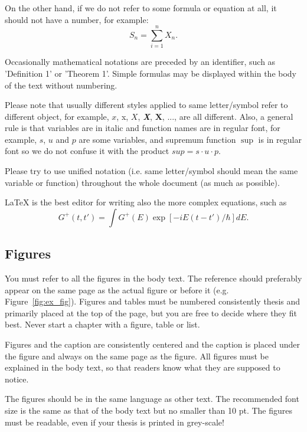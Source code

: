 On the other hand, if we do not refer to some formula or equation at all, it should not have a number, for example:
\[
S_n=\sum_{i=1}^n X_n.
\]

Occasionally mathematical notations are preceded by an
identifier, such as 'Definition 1' or 'Theorem 1'. Simple formulas may 
be displayed within the body of the text without numbering.

Please note that usually different styles applied to same letter/symbol refer to different object, for example, $x$, x, $X$, \textit{\textbf{X}}, $\mathbf{X}$, ..., are all different. Also, a general rule is that variables are in italic and function names are in regular font, for example, $s$, $u$ and $p$ are some variables, and supremum function $\sup$ is in regular font so we do not confuse it with the product $sup=s\cdot u\cdot p$. 

Please try to use unified notation (i.e. same letter/symbol should mean the same variable or function) throughout the whole document (as much as possible).


LaTeX is the best editor for writing also the more complex equations, such as
\begin{equation}
  \label{eq:fourier}
  G^+(t,t')= \int G^+(E) \exp[-iE(t-t')/\hbar] dE.
\end{equation}


\subsection{Figures}

You must refer to all the figures in the body text. The reference
should preferably appear on the same page as the actual figure or
before it (e.g. Figure~\ref{fig:ex_fig}). Figures and tables must be numbered consistently thesis
and primarily placed at the top of the page, but you are free to
decide where they fit best. Never start a chapter with a figure, table
or list.

Figures and the caption are consistently centered  and the caption is 
placed under the figure and always on the same page as the figure. 
All figures must be explained in the body text, so that readers know 
what they are supposed to notice. 

The figures should be in the same language as other text. The recommended 
font size is the same as that of the body text but no smaller than 10 pt. 
The figures must be readable, even if your thesis is printed in grey-scale!

